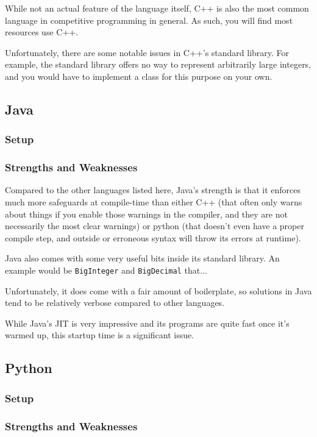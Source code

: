 While not an actual feature of the language itself, C++ is also the most common language in competitive programming in general. As such, you will find most resources use C++.

Unfortunately, there are some notable issues in C++'s standard library. For example, the standard library offers no way to represent arbitrarily large integers, and you would have to implement a class for this purpose on your own.

\subsection{Java}
\subsubsection{Setup}
\subsubsection{Strengths and Weaknesses}

Compared to the other languages listed here, Java's strength is that it enforces much more safeguards at compile-time than either C++ (that often only warns about things if you enable those warnings in the compiler, and they are not necessarily the most clear warnings) or python (that doesn't even have a proper compile step, and outside or erroneous syntax will throw its errors at runtime).

Java also comes with some very useful bits inside its standard library. An example would be \texttt{BigInteger} and \texttt{BigDecimal} that...

Unfortunately, it does come with a fair amount of boilerplate, so solutions in Java tend to be relatively verbose compared to other languages.

While Java's JIT is very impressive and its programs are quite fast once it's warmed up, this startup time is a significant issue.

\subsection{Python}
\subsubsection{Setup}
\subsubsection{Strengths and Weaknesses}

